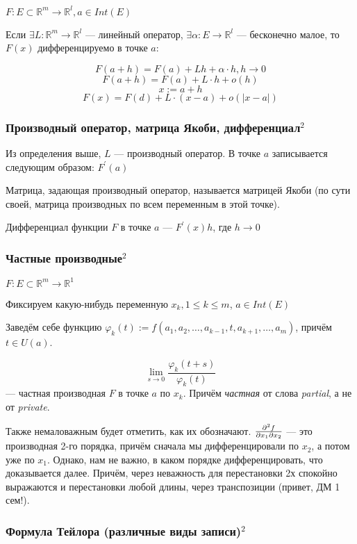 \documentclass{article}
\begin{document}
$F : E \subset \mathbb{R}^m \rightarrow \mathbb{R}^l, a \in Int(E)$

Если $\exists L : \mathbb{R}^m \rightarrow \mathbb{R}^l$ --- линейный оператор, $\exists \alpha : E \rightarrow \mathbb{R}^l$ --- бесконечно малое, то $F(x)$ дифференцируемо в точке $a$:

$$
F(a+h)=F(a)+Lh+\alpha \cdot h, h \rightarrow 0
$$
$$
F(a+h)=F(a)+L \cdot h+o(h)
$$
$$
x:=a+h
$$
$$
F(x)=F(d)+L \cdot(x-a)+o(|x-a|)
$$

\subsubsection{Производный оператор, матрица Якоби, дифференциал\texorpdfstring{$^2$}{}}

Из определения выше, $L$ --- производный оператор.
В точке $a$ записывается следующим образом: $F^\prime(a)$


Матрица, задающая производный оператор, называется матрицей Якоби (по сути своей, матрица производных по всем переменным в этой точке).

Дифференциал функции $F$ в точке $a$ --- $F^\prime(x)h$, где $h \rightarrow 0$

\subsubsection{Частные производные\texorpdfstring{$^2$}{}}

$F : E \subset \mathbb{R}^m \rightarrow \mathbb{R}^1 $

Фиксируем какую-нибудь переменную $x_k, 1 \le k \le m$, $a \in Int(E)$

Заведём себе функцию $\varphi_k(t) := f(a_1, a_2, \ldots, a_{k - 1}, t, a_{k + 1}, \ldots, a_m)$, причём $t \in U(a)$.

\[\lim_{s \rightarrow 0} \frac{\varphi_k(t + s)}{\varphi_k(t)}\] --- частная производная $F$ в точке
$a$ по $x_k$. Причём \textit{частная} от слова \textit{partial}, а не от \textit{private}.

Также немаловажным будет отметить, как их обозначают. $\pdv{f}{x_1}{x_2}$ --- это производная 2-го порядка, причём сначала мы дифференцировали по $x_2$, а потом уже по $x_1$. Однако, нам не важно, в каком порядке дифференцировать, что доказывается далее. Причём, через неважность для перестановки 2х спокойно выражаются и перестановки любой длины, через транспозиции (привет, ДМ 1 сем!).



\subsubsection{Формула Тейлора (различные виды записи)\texorpdfstring{$^2$}{}}
\end{document}

